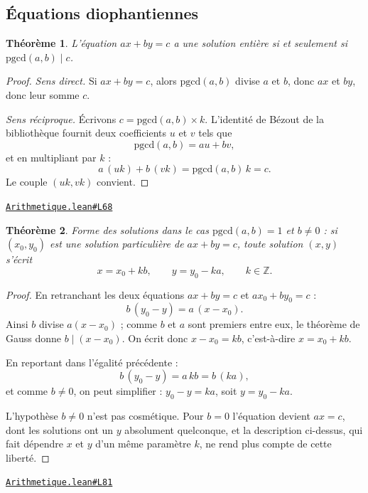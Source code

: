 \documentclass[11pt,a4paper]{article}
\theoremstyle{definition}
\theoremstyle{plain}
\newtheorem{theoreme}{Théorème}
\newcommand{\source}[2]{\par\smallskip\noindent\hfill{\footnotesize\href{#1}{\texttt{#2}}}\par\smallskip}
\begin{document}
\subsection{Équations diophantiennes}

\begin{theoreme}
L'équation $ax + by = c$ a une solution entière si et seulement si
$\mathrm{pgcd}(a, b) \mid c$.
\end{theoreme}

\begin{proof}
\emph{Sens direct.} Si $ax + by = c$, alors $\mathrm{pgcd}(a,b)$ divise $a$ et $b$, donc
$ax$ et $by$, donc leur somme $c$.

\emph{Sens réciproque.} Écrivons $c = \mathrm{pgcd}(a, b) \times k$. L'identité de Bézout
de la bibliothèque fournit deux coefficients $u$ et $v$ tels que
\[ \mathrm{pgcd}(a, b) = au + bv , \]
et en multipliant par $k$ :
\[ a\,(uk) + b\,(vk) = \mathrm{pgcd}(a, b)\,k = c . \]
Le couple $(uk, vk)$ convient.
\end{proof}
\source{https://github.com/Commutator-IO/learn-lean/blob/main/cours/02-lycee/10-specialite-mathematiques-terminale-s/Arithmetique.lean\#L68}{Arithmetique.lean\#L68}

\begin{theoreme}
Forme des solutions dans le cas $\mathrm{pgcd}(a, b) = 1$ et $b \ne 0$ : si $(x_0, y_0)$
est une solution particulière de $ax + by = c$, toute solution $(x, y)$ s'écrit
\[ x = x_0 + kb , \qquad y = y_0 - ka , \qquad k \in \mathbb{Z} . \]
\end{theoreme}

\begin{proof}
En retranchant les deux équations $ax + by = c$ et $ax_0 + by_0 = c$ :
\[ b\,(y_0 - y) = a\,(x - x_0) . \]
Ainsi $b$ divise $a(x - x_0)$ ; comme $b$ et $a$ sont premiers entre eux, le théorème de
Gauss donne $b \mid (x - x_0)$. On écrit donc $x - x_0 = kb$, c'est-à-dire
$x = x_0 + kb$.

En reportant dans l'égalité précédente :
\[ b\,(y_0 - y) = a\,kb = b\,(ka) , \]
et comme $b \ne 0$, on peut simplifier : $y_0 - y = ka$, soit $y = y_0 - ka$.

\medskip\noindent
L'hypothèse $b \ne 0$ n'est pas cosmétique. Pour $b = 0$ l'équation devient $ax = c$, dont
les solutions ont un $y$ absolument quelconque, et la description ci-dessus, qui fait
dépendre $x$ et $y$ d'un même paramètre $k$, ne rend plus compte de cette liberté.
\end{proof}
\source{https://github.com/Commutator-IO/learn-lean/blob/main/cours/02-lycee/10-specialite-mathematiques-terminale-s/Arithmetique.lean\#L81}{Arithmetique.lean\#L81}
\end{document}
